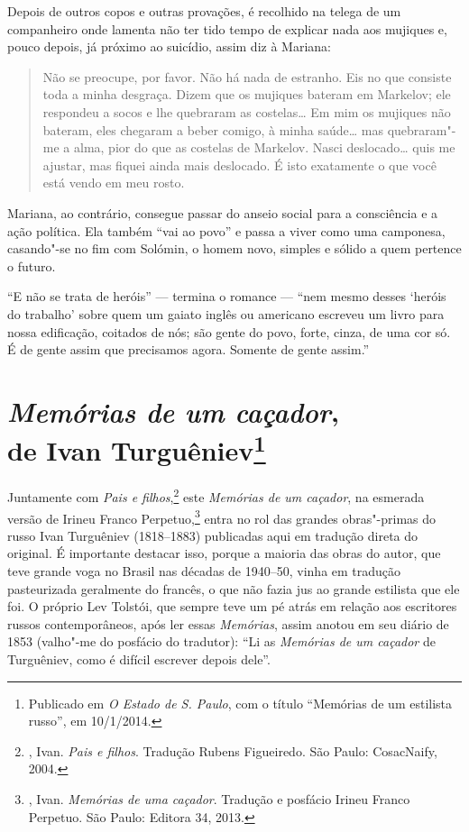 Depois de outros copos e outras provações, é recolhido na telega de um companheiro onde lamenta não ter tido tempo de explicar nada aos mujiques e, pouco depois, já próximo ao suicídio, assim diz à Mariana:

\begin{quotation}
Não se preocupe, por favor. Não há nada de estranho. Eis no que consiste toda a minha desgraça. Dizem que os mujiques bateram em Markelov; ele respondeu a socos e lhe quebraram as costelas\ldots{} Em mim os mujiques não bateram, eles chegaram a beber comigo, à minha saúde\ldots{} mas quebraram"-me a alma, pior do que as costelas de Markelov. Nasci deslocado\ldots{} quis me
ajustar, mas fiquei ainda mais deslocado. É isto exatamente o que você está vendo em meu rosto.
\end{quotation}

Mariana, ao contrário, consegue passar do anseio social para a consciência e a ação política. Ela também ``vai ao povo'' e passa a
viver como uma camponesa, casando"-se no fim com Solómin, o homem novo, simples e sólido a quem pertence o futuro.

``E não se trata de heróis'' --- termina o romance --- ``nem mesmo desses `heróis do trabalho' sobre quem um gaiato inglês ou americano escreveu um livro para nossa edificação, coitados de nós; são gente do povo, forte, cinza, de uma cor só. É de gente assim que precisamos agora. Somente de gente assim.''

\chapter{\emph{Memórias de um caçador},\\ de Ivan Turguêniev\footnote{Publicado em \emph{O Estado de S. Paulo}, com o título ``Memórias de um estilista russo'', em 10/1/2014.}}
\label{memoriascacador}

Juntamente com \emph{Pais e filhos},\footnote{, Ivan. \emph{Pais e filhos}. Tradução Rubens Figueiredo. São Paulo: CosacNaify, 2004.} este \emph{Memórias de um caçador}, na esmerada
versão de Irineu Franco Perpetuo,\footnote{, Ivan. \emph{Memórias de uma caçador}. Tradução e posfácio Irineu Franco Perpetuo. São Paulo: Editora 34, 2013.} entra no rol das grandes
obras"-primas do russo Ivan Turguêniev (1818--1883) publicadas aqui em tradução direta do original. É importante destacar isso, porque a
maioria das obras do autor, que teve grande voga no Brasil nas décadas de 1940--50, vinha em tradução pasteurizada geralmente do francês, o que não fazia jus ao grande estilista que ele foi. O próprio Lev Tolstói,
que sempre teve um pé atrás em relação aos escritores russos contemporâneos, após ler essas \emph{Memórias}, assim anotou em seu
diário de 1853 (valho"-me do posfácio do tradutor): ``Li as \emph{Memórias de um caçador} de Turguêniev, como é difícil escrever depois dele''.

